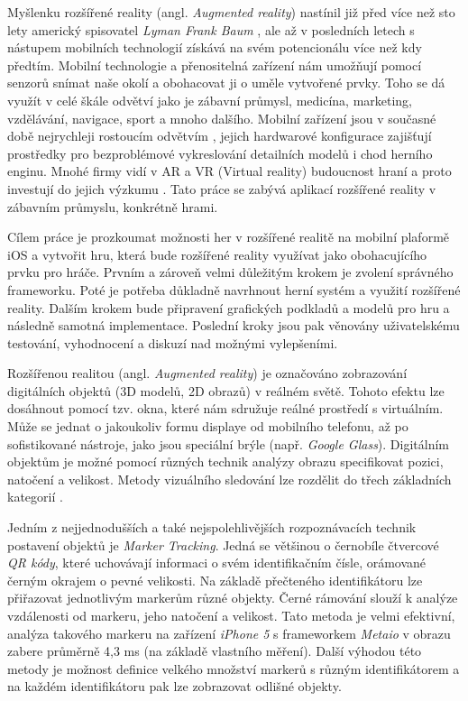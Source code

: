 \documentclass[twoside,12pt]{article}
\begin{document}
% 
Myšlenku rozšířené reality (angl. \textit{Augmented reality}) nastínil již před více než sto lety americký spisovatel \textit{Lyman Frank Baum} \cite{baum}, ale až v posledních letech s nástupem mobilních technologií získává na svém potencionálu více než kdy předtím. Mobilní technologie a přenositelná zařízení nám umožňují pomocí senzorů snímat naše okolí a obohacovat ji o uměle vytvořené prvky. Toho se dá využít v celé škále odvětví jako je zábavní průmysl, medicína, marketing, vzdělávání, navigace, sport a mnoho dalšího. Mobilní zařízení jsou v současné době nejrychleji rostoucím odvětvím \cite{mobile_economy}, jejich hardwarové konfigurace zajišťují prostředky pro bezproblémové vykreslování detailních modelů i chod herního enginu. Mnohé firmy vidí v AR a VR (Virtual reality) budoucnost hraní a proto investují do jejich výzkumu \cite{guardian_samsung}. Tato práce se zabývá aplikací rozšířené reality v zábavním průmyslu, konkrétně hrami. 

% 
Cílem práce je prozkoumat možnosti her v rozšířené realitě na mobilní plaformě iOS a vytvořit hru, která bude rozšířené reality využívat jako obohacujícího prvku pro hráče. Prvním a zároveň velmi důležitým krokem je zvolení správného frameworku. Poté je potřeba důkladně navrhnout herní systém a využití rozšířené reality. Dalším krokem bude připravení grafických podkladů a modelů pro hru a následně samotná implementace. Poslední kroky jsou pak věnovány uživatelskému testování, vyhodnocení a diskuzí nad možnými vylepšeními.

%
%

Rozšířenou realitou (angl. \textit{Augmented reality}) je označováno zobrazování digitálních objektů (3D modelů, 2D obrazů) v reálném světě. Tohoto efektu lze dosáhnout pomocí tzv. okna, které nám sdružuje reálné prostředí s virtuálním. Může se jednat o jakoukoliv formu displaye od mobilního telefonu, až po sofistikované nástroje, jako jsou speciální brýle (např. \textit{Google Glass}). Digitálním objektům je možné pomocí různých technik analýzy obrazu specifikovat pozici, natočení a velikost. Metody vizuálního sledování lze rozdělit do třech základních kategorií \cite{klein_visual_tracking}.

Jedním z nejjednodušších a také nejspolehlivějších rozpoznávacích technik postavení objektů je \textit{Marker Tracking}. Jedná se většinou o černobíle čtvercové \textit{QR kódy}, které uchovávají informaci o svém identifikačním čísle, orámované černým okrajem o pevné velikosti. Na základě přečteného identifikátoru lze přiřazovat jednotlivým markerům různé objekty. Černé rámování slouží k analýze vzdálenosti od markeru, jeho natočení a velikost. Tato metoda je velmi efektivní, analýza takového markeru na zařízení \textit{iPhone 5} s frameworkem \textit{Metaio} v obrazu zabere průměrně 4,3 ms (na základě vlastního měření). Další výhodou této metody je možnost definice velkého množství markerů s různým identifikátorem a na každém identifikátoru pak lze zobrazovat odlišné objekty.
\end{document}
